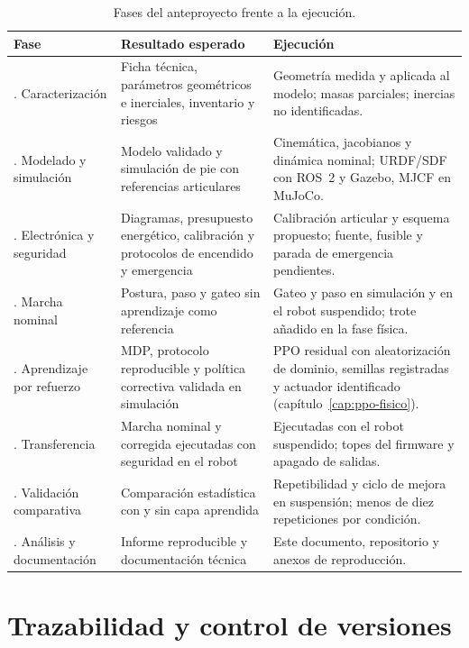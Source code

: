 \begin{table}[H]
\centering
\small
\caption{Fases del anteproyecto frente a la ejecución.}
\label{tab:fases-plan-ejecucion}
\begin{tabular}{>{\raggedright\arraybackslash}p{}>{\raggedright\arraybackslash}p{}>{\raggedright\arraybackslash}p{}}
\toprule
\textbf{Fase} & \textbf{Resultado esperado} & \textbf{Ejecución} \\
\midrule
1. Caracterización & Ficha técnica, parámetros geométricos e inerciales, inventario y riesgos & Geometría medida y aplicada al modelo; masas parciales; inercias no identificadas. \\
2. Modelado y simulación & Modelo validado y simulación de pie con referencias articulares & Cinemática, jacobianos y dinámica nominal; URDF/SDF con ROS~2 y Gazebo, MJCF en MuJoCo. \\
3. Electrónica y seguridad & Diagramas, presupuesto energético, calibración y protocolos de encendido y emergencia & Calibración articular y esquema propuesto; fuente, fusible y parada de emergencia pendientes. \\
4. Marcha nominal & Postura, paso y gateo sin aprendizaje como referencia & Gateo y paso en simulación y en el robot suspendido; trote añadido en la fase física. \\
5. Aprendizaje por refuerzo & MDP, protocolo reproducible y política correctiva validada en simulación & PPO residual con aleatorización de dominio, semillas registradas y actuador identificado (capítulo~\ref{cap:ppo-fisico}). \\
6. Transferencia & Marcha nominal y corregida ejecutadas con seguridad en el robot & Ejecutadas con el robot suspendido; topes del firmware y apagado de salidas. \\
7. Validación comparativa & Comparación estadística con y sin capa aprendida & Repetibilidad y ciclo de mejora en suspensión; menos de diez repeticiones por condición. \\
8. Análisis y documentación & Informe reproducible y documentación técnica & Este documento, repositorio y anexos de reproducción. \\
\bottomrule
\end{tabular}
\end{table}

\section{Trazabilidad y control de versiones}

